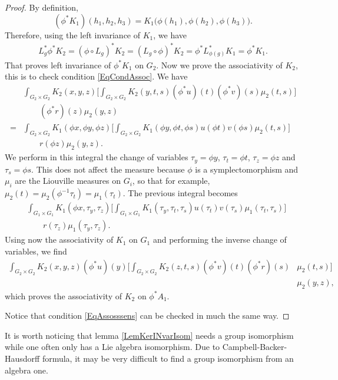 \begin{proof}
By definition,
\[ 
(\phi^*K_1)(h_1,h_2,h_3)=K_1\big( \phi(h_1),\phi(h_2),\phi(h_3)\big).
\]
Therefore, using the left invariance of $K_1$, we have
\[ 
\begin{split}
	L_{g}^*\phi^*K_2=(\phi\circ L_{g})^*K_2=(L_{g}\circ\phi)^*K_2=\phi^*L_{\phi(g)}^*K_1=\phi^*K_1.
\end{split}  
\]
That proves left invariance of $\phi^*K_1$ on $G_{2}$.  Now we prove the associativity of $K_2$, this is to check condition  \eqref{EqCondAssoc}. We have
\[
\begin{split}
 &\int_{G_2\times G_2}K_2(x,y,z)\Bigg[ \int_{G_2\times G_2}K_2(y,t,s)(\phi^*u)(t)(\phi^*v)(s)\mu_2(t,s) \Bigg]\\
&\qquad(\phi^*r)(z)\mu_2(y,z)\\
=&\int_{G_2\times G_2}K_1(\phi x,\phi y,\phi z)\Bigg[  \int_{G_2\times G_2}K_1(\phi y,\phi t,\phi s)u(\phi t)v(\phi s)\mu_2(t,s)  \Bigg]\\
&\qquad r(\phi z)\mu_2(y,z).
\end{split}
\]
We perform in this integral the change of variables $\tau_y=\phi y$, $\tau_t=\phi t$, $\tau_z=\phi z$ and $\tau_s=\phi s$. This does not affect the measure because  $\phi$ is a symplectomorphism and $\mu_i$ are the Liouville measures on $G_i$, so that for example,  $\mu_2(t)=\mu_2(\phi^{-1}\tau_t)=\mu_1(\tau_t)$. The previous integral becomes
\[ 
\begin{split}
  &\int_{G_1\times G_1}K_1(\phi x,\tau_y,\tau_z)\Bigg[  \int_{G_1\times G_1}K_1(\tau_y,\tau_t,\tau_s)u(\tau_t)v(\tau_s)\mu_1(\tau_t,\tau_s)  \Bigg]\\
&\qquad r(\tau_z)\mu_1(\tau_y,\tau_z).
\end{split}
\]
Using now the associativity of $K_1$ on $G_1$ and performing the inverse change of variables, we find
\[ 
\begin{split}
\int_{G_2\times G_2}K_2(x,y,z)(\phi^*u)(y)\Bigg[ \int_{G_2\times G_2}K_2(z,t,s)(\phi^*v)(t)(\phi^*r)(s)&\mu_2(t,s)   \Bigg]\\
					&\mu_2(y,z),
\end{split}  
\]
which proves the associativity of $K_2$ on $\phi^*A_1$.

Notice that condition \eqref{EqAssosssens} can be checked in much the same way.

\end{proof}

 It is worth noticing that lemma \ref{LemKerINvarIsom} needs a group isomorphism while one often only has a Lie algebra isomorphism. Due to Campbell-Backer-Hausdorff formula, it may be very difficult to find a group isomorphism from an algebra one. 

